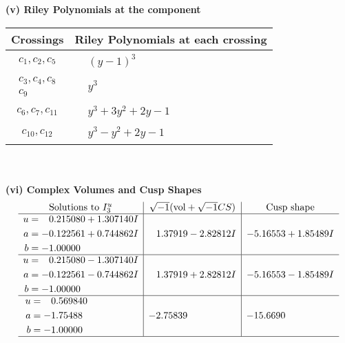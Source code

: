 \documentclass[1p]{elsarticle_modified}
\theoremstyle{definition}
\newcommand{\I}{\sqrt{-1}}
\begin{document}
\newpage\renewcommand{\arraystretch}{1}
\flushleft \textbf{(v) Riley Polynomials at the component}\newline \\
\begin{tabular}{m{50pt}|m{274pt}}
Crossings & \hspace{64pt}Riley Polynomials at each crossing \\
\hline $$\begin{aligned}c_{1},c_{2},c_{5}\end{aligned}$$&$\begin{aligned}
&(y-1)^3
\end{aligned}$\\
\hline $$\begin{aligned}c_{3},c_{4},c_{8}\\c_{9}\end{aligned}$$&$\begin{aligned}
&y^3
\end{aligned}$\\
\hline $$\begin{aligned}c_{6},c_{7},c_{11}\end{aligned}$$&$\begin{aligned}
&y^3+3 y^2+2 y-1
\end{aligned}$\\
\hline $$\begin{aligned}c_{10},c_{12}\end{aligned}$$&$\begin{aligned}
&y^3- y^2+2 y-1
\end{aligned}$\\
\hline
\end{tabular}\\~\\
\newpage\flushleft \textbf{(vi) Complex Volumes and Cusp Shapes}
$$\begin{array}{c|c|c}  
\text{Solutions to }I^u_{3}& \I (\text{vol} + \sqrt{-1}CS) & \text{Cusp shape}\\
 \hline 
\begin{aligned}
u &= \phantom{-}0.215080 + 1.307140 I \\
a &= -0.122561 + 0.744862 I \\
b &= -1.00000\phantom{ +0.000000I}\end{aligned}
 & \phantom{-}1.37919 - 2.82812 I & -5.16553 + 1.85489 I \\ \hline\begin{aligned}
u &= \phantom{-}0.215080 - 1.307140 I \\
a &= -0.122561 - 0.744862 I \\
b &= -1.00000\phantom{ +0.000000I}\end{aligned}
 & \phantom{-}1.37919 + 2.82812 I & -5.16553 - 1.85489 I \\ \hline\begin{aligned}
u &= \phantom{-}0.569840\phantom{ +0.000000I} \\
a &= -1.75488\phantom{ +0.000000I} \\
b &= -1.00000\phantom{ +0.000000I}\end{aligned}
 & -2.75839\phantom{ +0.000000I} & -15.6690\phantom{ +0.000000I}\\
 \hline 
 \end{array}$$\newpage
\end{document}
